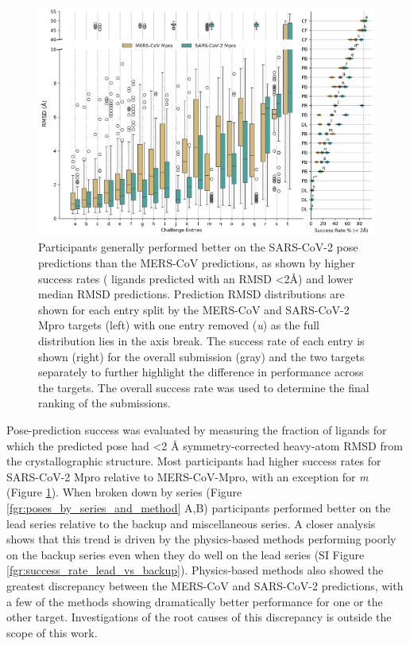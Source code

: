 \documentclass[journal=jcim,manuscript=article]{achemso}
\begin{document}
\begin{figure}
    \includegraphics[width=6in
    ]{04_figs_leaderboards/pose_comp.png}
  \caption{Participants generally performed better on the SARS-CoV-2 pose predictions than the MERS-CoV predictions, as shown by higher success rates ( ligands predicted with an RMSD \textless2Å) and lower median RMSD predictions. Prediction RMSD distributions are shown for each entry split by the MERS-CoV and SARS-CoV-2 Mpro targets (left) with one entry removed (\textit{u}) as the full distribution lies in the axis break. The success rate of each entry is shown (right) for the overall submission (gray) and the two targets separately to further highlight the difference in performance across the targets. The overall success rate was used to determine the final ranking of the submissions.}
  \label{fgr:poses_leaderboard}
\end{figure}

Pose-prediction success was evaluated by measuring the fraction of ligands for which the predicted pose had \textless 2 Å symmetry-corrected heavy-atom RMSD from the crystallographic structure. Most participants had higher success rates for SARS-CoV-2 Mpro relative to MERS-CoV-Mpro, with an exception for \textit{m} (Figure \ref{fgr:poses_leaderboard}). When broken down by series (Figure \ref{fgr:poses_by_series_and_method} A,B) participants performed better on the lead series relative to the backup and miscellaneous series. A closer analysis shows that this trend is driven by the physics-based methods performing poorly on the backup series even when they do well on the lead series (SI Figure \ref{fgr:success_rate_lead_vs_backup}). Physics-based methods also showed the greatest discrepancy between the MERS-CoV and SARS-CoV-2 predictions, with a few of the methods showing dramatically better performance for one or the other target. Investigations of the root causes of this discrepancy is outside the scope of this work. 
\end{document}

